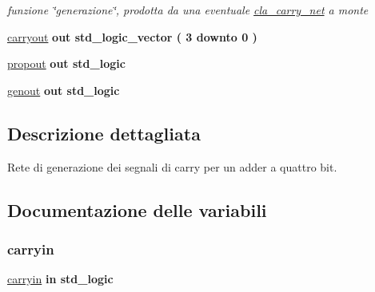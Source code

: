 \begin{DoxyCompactItemize}
\begin{DoxyCompactList}\small\item\em funzione \char`\"{}generazione\char`\"{}, prodotta da una eventuale \hyperlink{classcla__carry__net}{cla\+\_\+carry\+\_\+net} a monte \end{DoxyCompactList}\item 
\hyperlink{group___carry_network_ga6b265f3fe41195485dfedd9824c3598f}{carryout}  {\bfseries {\bfseries \textcolor{vhdlchar}{out}\textcolor{vhdlchar}{ }}} {\bfseries \textcolor{vhdlchar}{std\+\_\+logic\+\_\+vector}\textcolor{vhdlchar}{ }\textcolor{vhdlchar}{(}\textcolor{vhdlchar}{ }\textcolor{vhdlchar}{ } \textcolor{vhdldigit}{3} \textcolor{vhdlchar}{ }\textcolor{vhdlchar}{downto}\textcolor{vhdlchar}{ }\textcolor{vhdlchar}{ } \textcolor{vhdldigit}{0} \textcolor{vhdlchar}{ }\textcolor{vhdlchar}{)}\textcolor{vhdlchar}{ }} 
\item 
\hyperlink{group___carry_network_ga5957c9cdd706cafd2da8855133a002c9}{propout}  {\bfseries {\bfseries \textcolor{vhdlchar}{out}\textcolor{vhdlchar}{ }}} {\bfseries \textcolor{vhdlchar}{std\+\_\+logic}\textcolor{vhdlchar}{ }} 
\item 
\hyperlink{group___carry_network_ga068cd5c4d23e284cb942702252ed1491}{genout}  {\bfseries {\bfseries \textcolor{vhdlchar}{out}\textcolor{vhdlchar}{ }}} {\bfseries \textcolor{vhdlchar}{std\+\_\+logic}\textcolor{vhdlchar}{ }} 
\end{DoxyCompactItemize}


\subsection{Descrizione dettagliata}
Rete di generazione dei segnali di carry per un adder a quattro bit. 



\subsection{Documentazione delle variabili}
\mbox{\label{group___carry_network_gaa556a73dc4a4de1a0d662b25adbcbe33}} 
\subsubsection{\texorpdfstring{carryin}{carryin}}
{\footnotesize\ttfamily \hyperlink{group___carry_network_gaa556a73dc4a4de1a0d662b25adbcbe33}{carryin} {\bfseries \textcolor{vhdlchar}{in}\textcolor{vhdlchar}{ }} {\bfseries \textcolor{vhdlchar}{std\+\_\+logic}\textcolor{vhdlchar}{ }} \hspace{0.3cm}{\ttfamily [Port]}}



